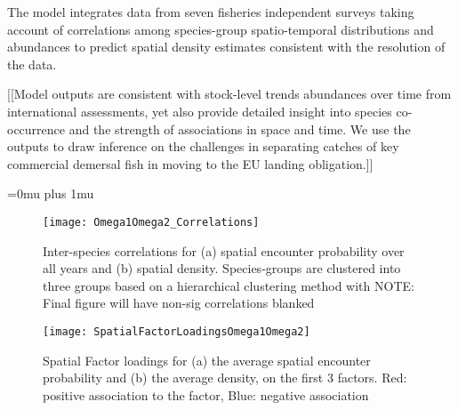 \documentclass{nature}
\begin{document}
\begin{linenumbers}
The model integrates data from seven fisheries independent surveys taking
account of correlations among species-group spatio-temporal distributions and
abundances to predict spatial density estimates consistent with the resolution
of the data. 

[[Model outputs are consistent with stock-level trends abundances over time
from international assessments, yet also provide detailed insight into species
co-occurrence and the strength of associations in space and time.  We use the
outputs to draw inference on the challenges in separating catches of key
commercial demersal fish in moving to the EU landing obligation.]]



\end{linenumbers}
\newpage
\Urlmuskip=0mu plus 1mu\relax

\small{}





\begin{figure}
\begin{center}
	\texttt{[image: Omega1Omega2\_Correlations]}
	\label{fig:1}
	\caption{Inter-species correlations for (a) spatial encounter
		probability over all years and (b) spatial density.
		Species-groups are clustered into three groups based on a
		hierarchical clustering method with NOTE: Final figure will
		have non-sig correlations blanked}
\end{center}
\end{figure}

\begin{figure}
\begin{center}
	\texttt{[image: SpatialFactorLoadingsOmega1Omega2]}
	\label{fig:2}
	\caption{Spatial Factor loadings for (a) the average spatial encounter
		probability and (b) the average density,  on the first 3
		factors. Red: positive association to the factor, Blue:
		negative association}
\end{center}
\end{figure}
\end{document}

